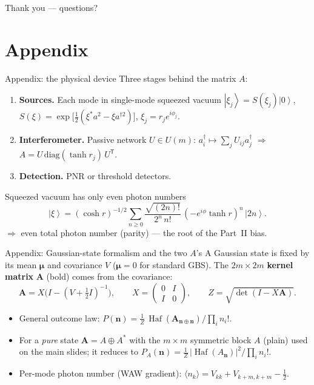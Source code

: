 \documentclass[10pt,aspectratio=169]{beamer}
\providecommand{\ket}[1]{\left|#1\right\rangle}
\newcommand{\Haf}{\operatorname{Haf}}
\newcommand{\vn}{\mathbf{n}}
\begin{document}
\begin{frame}
\centering\Large Thank you --- questions?
\end{frame}

\appendix
\section*{Appendix}

\begin{frame}{Appendix: the physical device}
Three stages behind the matrix $A$:
\begin{enumerate}
  \item \textbf{Sources.} Each mode in single-mode squeezed vacuum
        $\ket{\xi_j}=S(\xi_j)\ket0$,
        $S(\xi)=\exp\!\big[\tfrac12(\xi^\ast a^2-\xi a^{\dagger2})\big]$,
        $\xi_j=r_je^{i\phi_j}$.
  \item \textbf{Interferometer.} Passive network $U\in U(m)$:
        $a_i^\dagger\mapsto\sum_jU_{ij}a_j^\dagger$ $\Rightarrow$
        $A=U\,\mathrm{diag}(\tanh r_j)\,U^{\mathsf T}$.
  \item \textbf{Detection.} PNR or threshold detectors.
\end{enumerate}
\begin{block}{Squeezed vacuum has only even photon numbers}
\[
\ket{\xi}=(\cosh r)^{-1/2}\sum_{n\ge0}
\frac{\sqrt{(2n)!}}{2^n\,n!}\,(-e^{i\phi}\tanh r)^n\,\ket{2n}.
\]
$\Rightarrow$ even total photon number (parity) --- the root of the Part~II bias.
\end{block}
\end{frame}

\begin{frame}{Appendix: Gaussian-state formalism and the two $A$'s}
A Gaussian state is fixed by its mean $\bm\mu$ and covariance $V$
($\bm\mu=0$ for standard GBS). The $2m\times2m$ \textbf{kernel matrix}
$\mathbf A$ (bold) comes from the covariance:
\[
\mathbf A=X\big(I-(V+\tfrac12 I)^{-1}\big),\qquad
X=\begin{pmatrix}0&I\\I&0\end{pmatrix},\qquad
Z=\sqrt{\det(I-X\mathbf A)} .
\]
\begin{itemize}
  \item General outcome law: $P(\vn)=\tfrac1Z\,\Haf(\mathbf A_{\vn\oplus\vn})/\prod_i n_i!$.
  \item For a \emph{pure} state $\mathbf A=A\oplus A^\ast$ with the $m\times m$
        symmetric block $A$ (plain) used on the main slides; it reduces to
        $P_A(\vn)=\tfrac1Z\,|\Haf(A_{\vn})|^2/\prod_i n_i!$.
  \item Per-mode photon number (WAW gradient):
        $\langle n_k\rangle=V_{kk}+V_{k+m,k+m}-\tfrac12$.
\end{itemize}
\end{frame}
\end{document}
